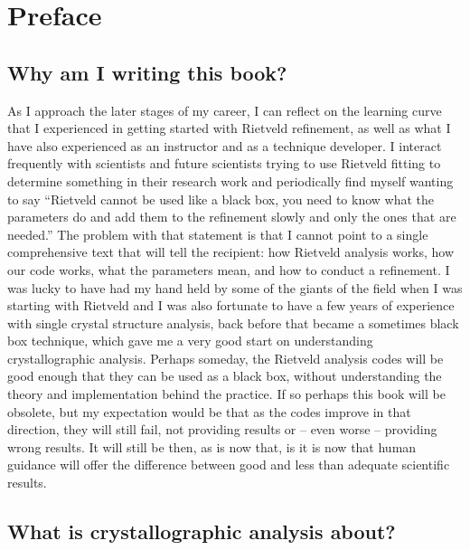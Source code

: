 \chapter{Preface}

\section*{Why am I writing this book?}

 As I approach the later stages of my career, I can reflect on the learning curve that I experienced in getting started with Rietveld refinement, as well as what I have also experienced as an instructor and as a technique developer. I interact frequently with scientists and future scientists trying to use Rietveld fitting to determine something in their research work and periodically find myself wanting to say “Rietveld cannot be used like a black box, you need to know what the parameters do and add them to the refinement slowly and only the ones that are needed.” The problem with that statement is that I cannot point to a single comprehensive text that will tell the recipient: how Rietveld analysis works, how our code works, what the parameters mean, and how to conduct a refinement. I was lucky to have had my hand held by some of the giants of the field when I was starting with Rietveld and I was also fortunate to have a few years of experience with single crystal structure analysis, back before that became a sometimes black box technique, which gave me a very good start on understanding crystallographic analysis. Perhaps someday, the Rietveld analysis codes will be good enough that they can be used as a black box, without understanding the theory and implementation behind the practice. If so perhaps this book will be obsolete, but my expectation would be that as the codes improve in that direction, they will still fail, not providing results or -- even worse -- providing wrong results. It will still be then, as is now that, is it is now that human guidance will offer the difference between good and less than adequate scientific results. 

 

\section*{What is crystallographic analysis about?}

